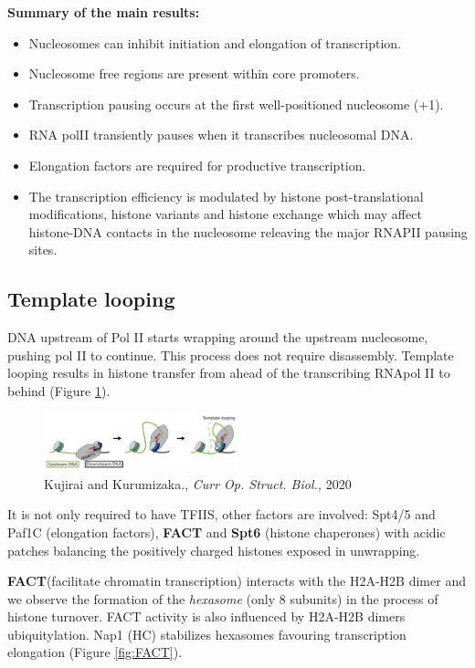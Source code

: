 \textbf{Summary of the main results:}
\begin{itemize}
\tightlist
\item
  Nucleosomes can inhibit initiation and elongation of transcription.
\item
  Nucleosome free regions are present within core promoters.
\item
  Transcription pausing occurs at the first well-positioned nucleosome (+1).
\item
  RNA polII transiently pauses when it transcribes nucleosomal DNA.
\item
  Elongation factors are required for productive transcription.
\item
  The transcription efficiency is modulated by histone post-translational modifications, histone variants and histone exchange which may affect histone-DNA contacts in the nucleosome releaving the major RNAPII pausing sites.
\end{itemize}

\hypertarget{template-looping}{%
\subsection{Template looping}\label{template-looping}}

DNA upstream of Pol II starts wrapping around the upstream nucleosome, pushing pol II to continue. This process does not require disassembly.
Template looping results in histone transfer from ahead of the transcribing RNApol II to behind (Figure \ref{fig:looping}). 
\begin{figure}
\centering
\includegraphics[width=0.5\textwidth]{../_resources/Screenshot_2022-10-05_at_23-04-42.png}
\caption{Kujirai and Kurumizaka., \emph{Curr Op. Struct. Biol.,} 2020}
\label{fig:looping}
\end{figure}

It is not only required to have TFIIS, other factors are involved: Spt4/5 and Paf1C (elongation factors), \textbf{FACT} and \textbf{Spt6} (histone chaperones) with acidic patches balancing the positively charged histones exposed in unwrapping.

\textbf{FACT}(facilitate chromatin transcription) interacts with the H2A-H2B dimer and we observe the formation of the \emph{hexasome} (only 8 subunits) in the process of histone turnover. FACT activity is also influenced by H2A-H2B dimers ubiquitylation. Nap1 (HC) stabilizes hexasomes favouring transcription elongation (Figure \ref{fig:FACT}).

